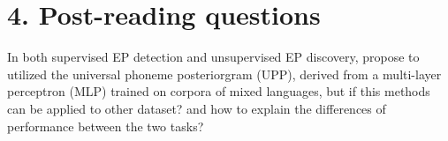 \documentclass[nobib]{tufte-handout}
\begin{document}
\bigskip
\section{4. Post-reading questions}
In both supervised EP detection and unsupervised EP discovery, \cite{wang2015supervised} propose to utilized the universal phoneme posteriorgram (UPP), derived from a multi-layer perceptron (MLP) trained on corpora of mixed languages, but if this methods can be applied to other dataset? and how to explain the differences of performance between the  two tasks?






\end{document}
